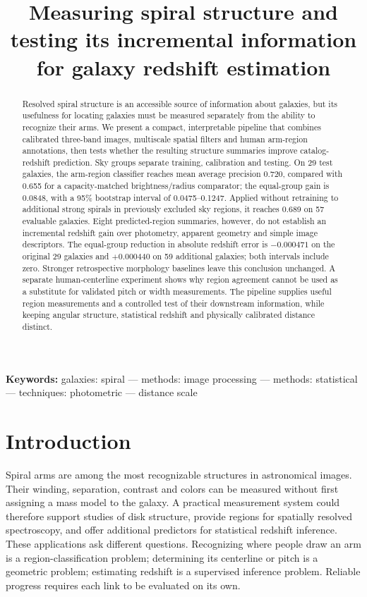 \documentclass[11pt]{article}
\title{Measuring spiral structure and testing its incremental information for galaxy redshift estimation}
\author{\PaperAuthors\PaperAffiliation}
\date{}
\begin{document}
\maketitle
\begin{abstract}
Resolved spiral structure is an accessible source of information about galaxies,
but its usefulness for locating galaxies must be measured separately from the
ability to recognize their arms. We present a compact, interpretable pipeline
that combines calibrated three-band images, multiscale spatial filters and
human arm-region annotations, then tests whether the resulting structure
summaries improve catalog-redshift prediction. Sky groups separate training,
calibration and testing. On 29 test galaxies, the arm-region classifier reaches
mean average precision 0.720, compared with 0.655 for a capacity-matched
brightness/radius comparator; the equal-group gain is 0.0848, with a 95\%
bootstrap interval of 0.0475--0.1247. Applied without retraining to additional
strong spirals in previously excluded sky regions, it reaches 0.689 on 57
evaluable galaxies. Eight predicted-region summaries, however, do not establish
an incremental redshift gain over photometry, apparent geometry and simple image
descriptors. The equal-group reduction in absolute redshift error is
$-0.000471$ on the original 29 galaxies and $+0.000440$ on 59 additional galaxies;
both intervals include zero. Stronger retrospective morphology baselines leave
this conclusion unchanged. A separate human-centerline experiment shows why
region agreement cannot be used as a substitute for validated pitch or width
measurements. The pipeline supplies useful region measurements and a controlled
test of their downstream information, while keeping angular structure,
statistical redshift and physically calibrated distance distinct.
\end{abstract}
\noindent\textbf{Keywords:} galaxies: spiral --- methods: image processing ---
methods: statistical --- techniques: photometric --- distance scale

\section{Introduction}
Spiral arms are among the most recognizable structures in astronomical images.
Their winding, separation, contrast and colors can be measured without first
assigning a mass model to the galaxy. A practical measurement system could
therefore support studies of disk structure, provide regions for spatially
resolved spectroscopy, and offer additional predictors for statistical redshift
inference. These applications ask different questions. Recognizing where people
draw an arm is a region-classification problem; determining its centerline or
pitch is a geometric problem; estimating redshift is a supervised inference
problem. Reliable progress requires each link to be evaluated on its own.
\end{document}
